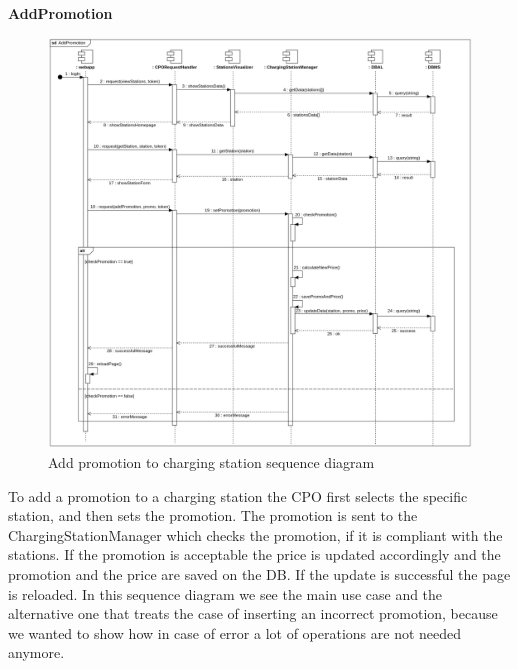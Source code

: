 \clearpage
\textbf{AddPromotion}\\
\begin{figure}[H]
    \centering
    \includegraphics[width=1\textwidth]{Images/cp2/runtime/AddPromotion.png}
    \caption{Add promotion to charging station sequence diagram}
\end{figure}
To add a promotion to a charging station the CPO first selects the specific station, and then sets the promotion. The promotion is sent to the ChargingStationManager which checks the promotion, if it is compliant with the stations. If the promotion is acceptable the price is updated accordingly and the promotion and the price are saved on the DB. If the update is successful the page is reloaded. In this sequence diagram we see the main use case and the alternative one that treats the case of inserting an incorrect promotion, because we wanted to show how in case of error a lot of operations are not needed anymore.

